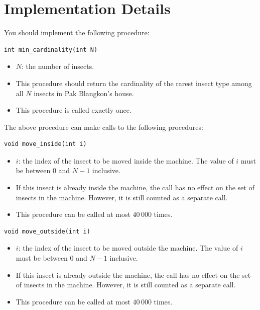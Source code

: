 \section*{Implementation Details}
You should implement the following procedure:

\begin{verbatim}
int min_cardinality(int N)
\end{verbatim}

\begin{itemize}
  \item $N$: the number of insects.
  \item This procedure should return the cardinality of the rarest insect type among all $N$ insects
  in Pak Blangkon's house.
  \item This procedure is called exactly once.
\end{itemize}

The above procedure can make calls to the following procedures:

\begin{verbatim}
void move_inside(int i)
\end{verbatim}

\begin{itemize}
  \item $i$: the index of the insect to be moved inside the machine. The value of $i$ must be between
  $0$ and $N-1$ inclusive.
  \item If this insect is already inside the machine, the call has no effect on the set of insects in
  the machine. However, it is still counted as a separate call.
  \item This procedure can be called at most $40\,000$ times.
\end{itemize}

\begin{verbatim}
void move_outside(int i)
\end{verbatim}

\begin{itemize}
  \item $i$: the index of the insect to be moved outside the machine. The value of $i$ must be
  between $0$ and $N-1$ inclusive.
  \item If this insect is already outside the machine, the call has no effect on the set of insects in
  the machine. However, it is still counted as a separate call.
  \item This procedure can be called at most $40\,000$ times.
\end{itemize}

